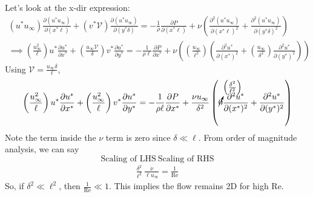 Let's look at the x-dir expression:
\begin{gather*}
    (u^* u_{\infty}) \frac{\partial (u^* u_{\infty})}{\partial (x^* \ell)} + (v^* \mathcal{V}) \frac{\partial (u^* u_{\infty})}{\partial (y^* \delta)} = -\frac{1}{\rho} \frac{\partial P}{\partial (x^* \ell)} + \nu \left(\frac{\partial^2 (u^* u_{\infty})}{\partial (x^* \ell)^2} + \frac{\partial^2 (u^* u_{\infty})}{\partial (y^* \delta)^2}\right) \\
    \implies \left(\frac{u_{\infty}^2}{\ell}\right) u^* \frac{\partial u^*}{\partial x^*} + \left(\frac{u_{\infty} \mathcal{V}}{\delta}\right) v^* \frac{\partial u^*}{\partial y^*} = -\frac{1}{\rho \ell} \frac{\partial P}{\partial x^*} + \nu \left(\left(\frac{u_{\infty}}{\ell^2}\right) \left(\frac{\partial^2 u^*}{\partial (x^*)^2} + \left(\frac{u_{\infty}}{\delta^2}\right) \frac{\partial^2 u^*}{\partial (y^*)^2}\right)\right) 
\end{gather*}
Using $\mathcal{V} = \frac{u_{\infty} \delta}{\ell}$, 
\begin{gather*}
    \left(\frac{u_{\infty}^2}{\ell}\right) u^* \frac{\partial u^*}{\partial x^*} + \left(\frac{u_{\infty}^2}{\ell}\right) v^* \frac{\partial u^*}{\partial y^*} = -\frac{1}{\rho \ell} \frac{\partial P}{\partial x^*} + \frac{\nu u_{\infty}}{\delta^2} \left(\cancelto{\left(\frac{\delta^2}{\ell^2}\right)}{0} \frac{\partial^2 u^*}{\partial (x^*)^2} + \frac{\partial^2 u^*}{\partial (y^*)^2}\right) 
\end{gather*}
Note the term inside the $\nu$ term is zero since $\delta \ll \ell$. From order of magnitude analysis, we can say
\begin{equation*}
    \text{Scaling of LHS} ~ \text{Scaling of RHS}
\end{equation*}
\begin{gather*}
    \frac{\delta^2}{\ell^2} ~ \frac{\nu}{\ell u_{\infty}} = \frac{1}{\text{Re}}
\end{gather*}
So, if $\delta^2 \ll \ell^2$, then $\frac{1}{\text{Re}} \ll 1$. This implies the flow remains 2D for high Re. 

